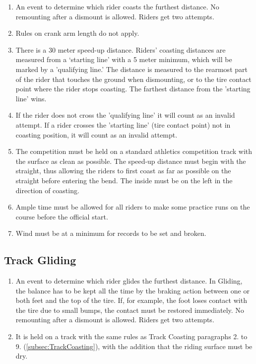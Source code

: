 \begin{enumerate}[leftmargin=1.5em,labelsep=*]
	\item An event to determine which rider coasts the furthest distance.
	No remounting after a dismount is allowed.
	Riders get two attempts.
	
	\item Rules on crank arm length do not apply.
	
	\item There is a 30 meter speed-up distance.
	Riders' coasting distances are measured from a `starting line' with a 5 meter minimum, 
  which will be marked by a 'qualifying line.'
	The distance is measured to the rearmost part of the rider that touches the ground when dismounting, 
  or to the tire contact point where the rider stops coasting.
	The farthest distance from the 'starting line' wins.
	
	\item If the rider does not cross the 'qualifying line' it will count as an invalid attempt.
	If a rider crosses the 'starting line' (tire contact point) not in coasting position, it will count as an invalid attempt.
	
	\item The competition must be held on a standard athletics competition track with the surface as clean as possible.
	The speed-up distance must begin with the straight, thus allowing the riders to first coast as far 
  as possible on the straight before entering the bend. The inside must be on the left in the direction of coasting.
	
	\item Ample time must be allowed for all riders to make some practice runs on the course before the official start.
	
	\item Wind must be at a minimum for records to be set and broken.
\end{enumerate}

\subsection{Track Gliding}

\begin{enumerate}[leftmargin=1.5em,labelsep=*]
	\item An event to determine which rider glides the furthest distance.
	In Gliding, the balance has to be kept all the time by the braking action between one or both feet and the top of the tire.
	If, for example, the foot loses contact with the tire due to small bumps, the contact must be restored immediately.
	No remounting after a dismount is allowed. Riders get two attempts.
	
	\item It is held on a track with the same rules as Track Coasting paragraphs 2. to 9. (\ref{subsec:TrackCoasting}), 
  with the addition that the riding surface must be dry.
\end{enumerate}

